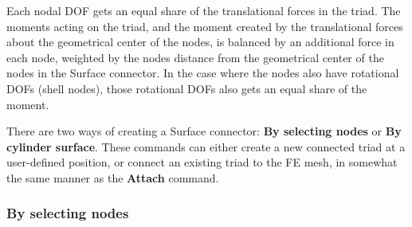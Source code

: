 Each nodal DOF gets an equal share of the translational forces in the triad.
The moments acting on the triad, and the moment created by the translational
forces about the geometrical center of the nodes, is balanced by an additional
force in each node, weighted by the nodes distance from the geometrical center
of the nodes in the Surface connector. In the case where the nodes also have
rotational DOFs (shell nodes), those rotational DOFs also gets an equal share
of the moment.

\parskip
{}
\vskip-5mm



There are two ways of creating a Surface connector:
\textbf{By selecting nodes} or \textbf{By cylinder surface}.
These commands can either create a new connected triad at a user-defined
position, or connect an existing triad to the FE mesh, in somewhat the same
manner as the \textbf{Attach} command.

\subsubsection{By selecting nodes}


